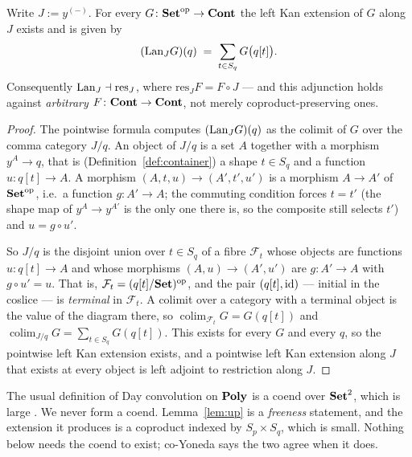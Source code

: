 \begin{Lemma}
\label{lem:lan}
Write $J:=y^{(-)}$. For every $G\colon\mathbf{Set}^{\mathrm{op}}\to\mathbf{Cont}$ the left Kan
extension of $G$ along $J$ exists and is given by
\[
   (\mathrm{Lan}_J G)(q)\;=\;\sum_{t\in S_q} G\bigl(q[t]\bigr).
\]
Consequently $\mathrm{Lan}_J\dashv\mathrm{res}_J$, where
$\mathrm{res}_J F=F\circ J$ --- and this adjunction holds against \emph{arbitrary}
$F\colon\mathbf{Cont}\to\mathbf{Cont}$, not merely coproduct-preserving ones.
\end{Lemma}

\begin{proof}
The pointwise formula computes $(\mathrm{Lan}_J G)(q)$ as the colimit of $G$ over the
comma category $J/q$. An object of $J/q$ is a set $A$ together with a morphism
$y^A\to q$, that is (Definition~\ref{def:container}) a shape $t\in S_q$ and a
function $u\colon q[t]\to A$. A morphism $(A,t,u)\to(A',t',u')$ is a morphism
$A\to A'$ of $\mathbf{Set}^{\mathrm{op}}$, i.e.\ a function $g\colon A'\to A$; the
commuting condition forces $t=t'$ (the shape map of $y^A\to y^{A'}$ is the only
one there is, so the composite still selects $t'$) and $u=g\circ u'$.

So $J/q$ is the disjoint union over $t\in S_q$ of a fibre $\mathcal F_t$ whose
objects are functions $u\colon q[t]\to A$ and whose morphisms
$(A,u)\to(A',u')$ are $g\colon A'\to A$ with $g\circ u'=u$. That is,
$\mathcal F_t=(q[t]/\mathbf{Set})^{\mathrm{op}}$, and the pair $(q[t],\mathrm{id})$ --- initial in
the coslice --- is \emph{terminal} in $\mathcal F_t$. A colimit over a category
with a terminal object is the value of the diagram there, so
$\operatorname{colim}_{\mathcal F_t}G=G(q[t])$ and
$\operatorname{colim}_{J/q}G=\sum_{t\in S_q}G(q[t])$. This exists for every $G$
and every $q$, so the pointwise left Kan extension exists, and a pointwise left
Kan extension along $J$ that exists at every object is left adjoint to
restriction along $J$.
\end{proof}

\begin{Remark}\label{rem:size}
The usual definition of Day convolution on $\mathbf{Poly}$ is a coend over $\mathbf{Set}^2$,
which is large \cite[eq.~(3.80)]{NiuSpivak}. We never form a coend.
Lemma~\ref{lem:up} is a \emph{freeness} statement, and the extension it produces
is a coproduct indexed by $S_p\times S_q$, which is small. Nothing below needs
the coend to exist; co-Yoneda \cite[eq.~(3.81)]{NiuSpivak} says the two agree
when it does.
\end{Remark}


